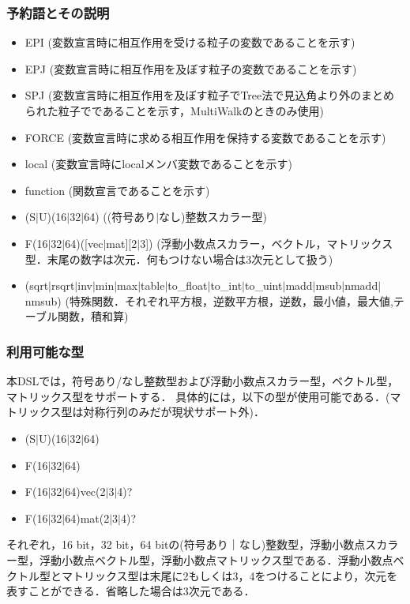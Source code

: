 \documentclass{article}
\begin{document}
 \subsubsection{予約語とその説明}
 \begin{itemize}
  \item EPI (変数宣言時に相互作用を受ける粒子の変数であることを示す)
  \item EPJ (変数宣言時に相互作用を及ぼす粒子の変数であることを示す)
  \item SPJ (変数宣言時に相互作用を及ぼす粒子でTree法で見込角より外のまとめられた粒子でであることを示す，MultiWalkのときのみ使用)
  \item FORCE (変数宣言時に求める相互作用を保持する変数であることを示す)
  \item local (変数宣言時にlocalメンバ変数であることを示す)
  \item function (関数宣言であることを示す)
  \item (S$|$U)(16$|$32$|$64) ((符号あり$|$なし)整数スカラー型)
  \item F(16$|$32$|$64)([vec$|$mat][2$|$3]) (浮動小数点スカラー，ベクトル，マトリックス型．末尾の数字は次元．何もつけない場合は3次元として扱う)
  \item (sqrt$|$rsqrt$|$inv$|$min$|$max$|$table$|$to\_float$|$to\_int$|$to\_uint$|$madd$|$msub$|$nmadd$|$nmsub) (特殊関数．それぞれ平方根，逆数平方根，逆数，最小値，最大値,テーブル関数，積和算)
 \end{itemize}

\subsubsection{利用可能な型}
本DSLでは，符号あり/なし整数型および浮動小数点スカラー型，ベクトル型，マトリックス型をサポートする．
具体的には，以下の型が使用可能である．(マトリックス型は対称行列のみだが現状サポート外)．
 \begin{itemize}
  \item (S$|$U)(16$|$32$|$64)
  \item F(16$|$32$|$64)
  \item F(16$|$32$|$64)vec(2$|$3$|$4)?
  \item F(16$|$32$|$64)mat(2$|$3$|$4)?
 \end{itemize}
 それぞれ，16 bit，32 bit，64 bitの(符号あり｜なし)整数型，浮動小数点スカラー型，浮動小数点ベクトル型，浮動小数点マトリックス型である．浮動小数点ベクトル型とマトリックス型は末尾に2もしくは3，4をつけることにより，次元を表すことができる．省略した場合は3次元である．
\end{document}

